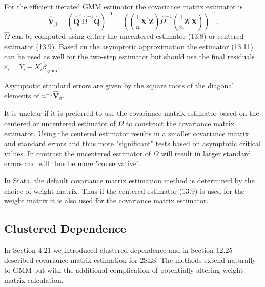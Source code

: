 \documentclass[10pt]{article}
\begin{document}
For the efficient iterated GMM estimator the covariance matrix estimator is
$$
\widehat{\boldsymbol{V}}_{\beta}=\left(\widehat{\boldsymbol{Q}}^{\prime} \widehat{\Omega}^{-1} \widehat{\boldsymbol{Q}}\right)^{-1}=\left(\left(\frac{1}{n} \boldsymbol{X}^{\prime} \boldsymbol{Z}\right) \widehat{\Omega}^{-1}\left(\frac{1}{n} \boldsymbol{Z}^{\prime} \boldsymbol{X}\right)\right)^{-1} .
$$
$\widehat{\Omega}$ can be computed using either the uncentered estimator (13.8) or centered estimator (13.9). Based on the asymptotic approximation the estimator (13.11) can be used as well for the two-step estimator but should use the final residuals $\widehat{e}_{i}=Y_{i}-X_{i}^{\prime} \widehat{\beta}_{\mathrm{gmm}}$.

Asymptotic standard errors are given by the square roots of the diagonal elements of $n^{-1} \widehat{\boldsymbol{V}}_{\beta}$.

It is unclear if it is preferred to use the covariance matrix estimator based on the centered or uncentered estimator of $\Omega$ to construct the covariance matrix estimator. Using the centered estimator results in a smaller covariance matrix and standard errors and thus more "significant" tests based on asymptotic critical values. In contrast the uncentered estimator of $\Omega$ will result in larger standard errors and will thus be more "conservative".

In Stata, the default covariance matrix estimation method is determined by the choice of weight matrix. Thus if the centered estimator (13.9) is used for the weight matrix it is also used for the covariance matrix estimator.

\subsection{Clustered Dependence}
In Section $4.21$ we introduced clustered dependence and in Section $12.25$ described covariance matrix estimation for 2SLS. The methods extend naturally to GMM but with the additional complication of potentially altering weight matrix calculation.
\end{document}
